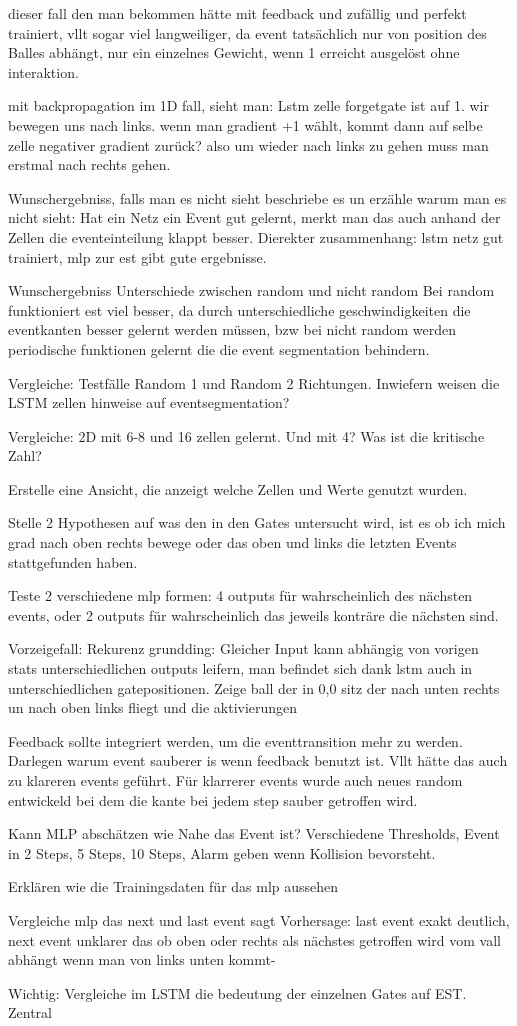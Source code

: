 dieser fall den man bekommen hätte mit feedback und zufällig und perfekt trainiert, vllt sogar viel langweiliger, da event tatsächlich nur von position des Balles abhängt, nur ein einzelnes Gewicht, wenn 1 erreicht ausgelöst ohne interaktion. 


mit backpropagation im 1D fall, sieht man: Lstm zelle forgetgate ist auf 1. wir bewegen uns nach links. wenn man gradient +1 wählt, kommt dann auf selbe zelle negativer gradient zurück? also um wieder nach links zu gehen muss man erstmal nach rechts gehen. 

Wunschergebniss, falls man es nicht sieht beschriebe es un erzähle warum man es nicht sieht: 
Hat ein Netz ein Event gut gelernt, merkt man das auch anhand der Zellen die eventeinteilung klappt besser.
Dierekter zusammenhang: lstm netz gut trainiert, mlp zur est gibt gute ergebnisse.

Wunschergebniss
Unterschiede zwischen random und nicht random
Bei random funktioniert est viel besser,  da  durch unterschiedliche geschwindigkeiten die eventkanten besser gelernt werden müssen, bzw bei nicht random werden periodische funktionen gelernt die die event segmentation behindern.

Vergleiche: Testfälle Random 1 und Random 2 Richtungen. Inwiefern weisen die LSTM zellen hinweise auf eventsegmentation? 

Vergleiche: 2D mit 6-8 und 16 zellen gelernt.
Und mit 4? Was ist die kritische Zahl?

Erstelle eine Ansicht, die anzeigt welche Zellen und Werte genutzt wurden.

Stelle 2 Hypothesen auf was den in den Gates untersucht wird, ist es ob ich mich grad nach oben rechts bewege oder das oben und links die letzten Events stattgefunden haben.

Teste 2 verschiedene mlp formen: 4 outputs für wahrscheinlich des nächsten events,
oder 2 outputs für wahrscheinlich das jeweils konträre die nächsten sind.


Vorzeigefall: Rekurenz grundding: Gleicher Input kann abhängig von vorigen stats unterschiedlichen outputs leifern, man befindet sich dank lstm auch in unterschiedlichen gatepositionen.
Zeige ball der in 0,0 sitz der nach unten rechts un nach oben links fliegt und die aktivierungen

Feedback sollte integriert werden, um die eventtransition mehr zu werden. Darlegen warum event sauberer is wenn feedback benutzt ist. Vllt hätte das auch zu klareren events geführt. Für klarrerer events wurde auch neues random entwickeld bei dem die kante bei jedem step sauber getroffen wird.

Kann MLP abschätzen wie Nahe das Event ist?
Verschiedene Thresholds, Event in 2 Steps, 5 Steps, 10 Steps, Alarm geben wenn Kollision bevorsteht.

Erklären wie die Trainingsdaten für das mlp aussehen

Vergleiche mlp das next und last event sagt
Vorhersage: last event exakt deutlich, next event unklarer das ob oben oder rechts als nächstes getroffen wird vom vall abhängt wenn man von links unten kommt-

Wichtig:
Vergleiche im LSTM die bedeutung der einzelnen Gates auf EST. Zentral

